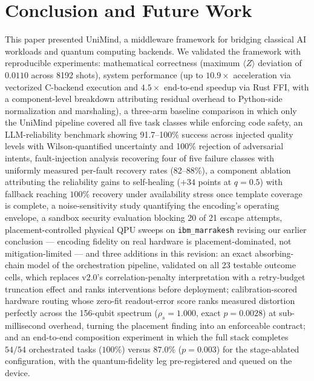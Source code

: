 ﻿\documentclass[12pt,a4paper]{article}
\begin{document}
\section{Conclusion and Future Work}\label{sec:conclusion}

This paper presented UniMind, a middleware framework for bridging classical AI workloads and quantum computing backends. We validated the framework with reproducible experiments: mathematical correctness (maximum $\langle Z \rangle$ deviation of $0.0110$ across 8192 shots), system performance (up to $10.9\times$ acceleration via vectorized C-backend execution and $4.5\times$ end-to-end speedup via Rust FFI, with a component-level breakdown attributing residual overhead to Python-side normalization and marshaling), a three-arm baseline comparison in which only the UniMind pipeline covered all five task classes while enforcing code safety, an LLM-reliability benchmark showing 91.7--100\% success across injected quality levels with Wilson-quantified uncertainty and 100\% rejection of adversarial intents, fault-injection analysis recovering four of five failure classes with uniformly measured per-fault recovery rates (82--88\%), a component ablation attributing the reliability gains to self-healing ($+34$ points at $q{=}0.5$) with fallback reaching $100\%$ recovery under availability stress once template coverage is complete, a noise-sensitivity study quantifying the encoding's operating envelope, a sandbox security evaluation blocking 20 of 21 escape attempts, placement-controlled physical QPU sweeps on \texttt{ibm\_marrakesh} revising our earlier conclusion --- encoding fidelity on real hardware is placement-dominated, not mitigation-limited --- and three additions in this revision: an exact absorbing-chain model of the orchestration pipeline, validated on all 23 testable outcome cells, which replaces v2.0's correlation-penalty interpretation with a retry-budget truncation effect and ranks interventions before deployment; calibration-scored hardware routing whose zero-fit readout-error score ranks measured distortion perfectly across the 156-qubit spectrum ($\rho_s = 1.000$, exact $p = 0.0028$) at sub-millisecond overhead, turning the placement finding into an enforceable contract; and an end-to-end composition experiment in which the full stack completes $54/54$ orchestrated tasks ($100\%$) versus $87.0\%$ ($p = 0.003$) for the stage-ablated configuration, with the quantum-fidelity leg pre-registered and queued on the device.
\end{document}
